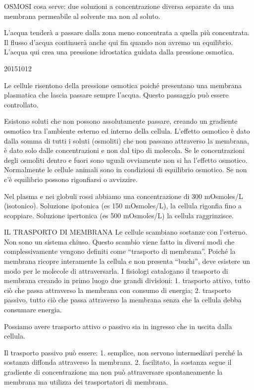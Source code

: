 \documentclass[]{article}
\begin{document}
OSMOSI cosa serve: due soluzioni a concentrazione diversa separate da
una membrana permeabile al solvente ma non al soluto.

L'acqua tenderà a passare dalla zona meno concentrata a quella più
concentrata. Il flusso d'acqua continuerà anche qui fin quando non
avremo un equilibrio. L'acqua qui crea una pressione idrostatica guidata
dalla pressione osmotica.

20151012

Le cellule risentono della pressione osmotica poiché presentano una
membrana plasmatica che lascia passare sempre l'acqua. Questo passaggio
può essere controllato.

Esistono soluti che non possono assolutamente passare, creando un
gradiente osmotico tra l'ambiente esterno ed interno della cellula.
L'effetto osmotico è dato dalla somma di tutti i soluti (osmoliti) che
non passano attraverso la membrana, è dato solo dalle concentrazioni e
non dal tipo di molecola. Se le concentrazioni degli osmoliti dentro e
fuori sono uguali ovviamente non si ha l'effetto osmotico. Normalmente
le cellule animali sono in condizioni di equilibrio osmotico. Se non c'è
equilibrio possono rigonfiarsi o avvizzire.

Nel plasma e nei globuli rossi abbiamo una concentrazione di 300
mOsmoles/L (isotonico). Soluzione ipotonica (es 150 mOsmoles/L), la
cellula rigonfia fino a scoppiare. Soluzione ipertonica (es 500
mOsmoles/L) la cellula raggrinzisce.

IL TRASPORTO DI MEMBRANA Le cellule scambiano sostanze con l'esterno.
Non sono un sistema chiuso. Questo scambio viene fatto in diversi modi
che complessivamente vengono definiti come ``trasporto di membrana''.
Poiché la membrana ricopre interamente la cellula e non presenta
``buchi'', deve esistere un modo per le molecole di attraversarla. I
fisiologi catalogano il trasporto di membrana creando in primo luogo due
grandi divisioni: 1. trasporto attivo, tutto ciò che passa attraverso la
membrana con consumo di energia; 2. trasporto passivo, tutto ciò che
passa attraverso la membrana senza che la cellula debba consumare
energia.

Possiamo avere trasporto attivo o passivo sia in ingresso che in uscita
dalla cellula.

Il trasporto passivo può essere: 1. semplice, non servono intermediari
perché la sostanza diffonda attraverso la membrana. 2. facilitato, la
sostanza segue il gradiente di concentrazione ma non può attraversare
spontaneamente la membrana ma utilizza dei trasportatori di membrana.
\end{document}
